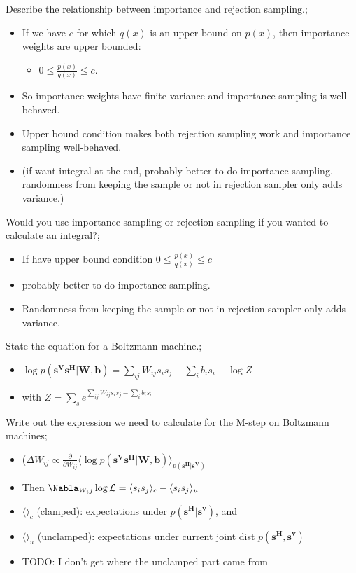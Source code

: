 \documentclass{article}
\begin{document}
Describe the relationship between importance and rejection sampling.; \begin{itemize}  \item If we have $c$ for which $q(x)$ is an upper bound on $p(x)$, then importance weights are upper bounded: \begin{itemize} \item $0 \leq \frac{p(x)}{q(x)} \leq c$. \end{itemize} \item So importance weights have finite variance and importance sampling is well-behaved. \item Upper bound condition makes both rejection sampling work and importance sampling well-behaved. \item (if want integral at the end, probably better to do importance sampling. randomness from keeping the sample or not in rejection sampler only adds variance.) \end{itemize} 

Would you use importance sampling or rejection sampling if you wanted to calculate an integral?; \begin{itemize} \item If have upper bound condition $0 \leq \frac{p(x)}{q(x)} \leq c$ \item probably better to do importance sampling.  \item Randomness from keeping the sample or not in rejection sampler only adds variance. \end{itemize}

State the equation for a Boltzmann machine.; \begin{itemize} \item $\log p(\mathbf{s^Vs^H|W, b}) = \sum_{ij}W_{ij}s_is_j - \sum_i b_is_i - \log Z$ \item with $Z = \sum_s e^{\sum_{ij}W_{ij}s_is_j - \sum_i b_i s_i}$ \end{itemize}

Write out the expression we need to calculate for the M-step on Boltzmann machines; \begin{itemize} \item ($\Delta W_{ij} \propto \frac{\partial}{\partial W_{ij}} \langle \log p(\mathbf{s^Vs^H|W, b}) \rangle_{p(\mathbf{s^H|s^V})}$ \item Then $\Nabla_{W_ij} \log \mathcal{L} = \langle s_is_j \rangle_c - \langle s_is_j \rangle_u$ \item $\langle \rangle_c$ (clamped): expectations under $p(\mathbf{s^H|s^v})$, and  \item $\langle \rangle_u$ (unclamped): expectations under current joint dist $p(\mathbf{s^H, s^v})$ \item TODO: I don't get where the unclamped part came from \end{itemize} 
\end{document}
